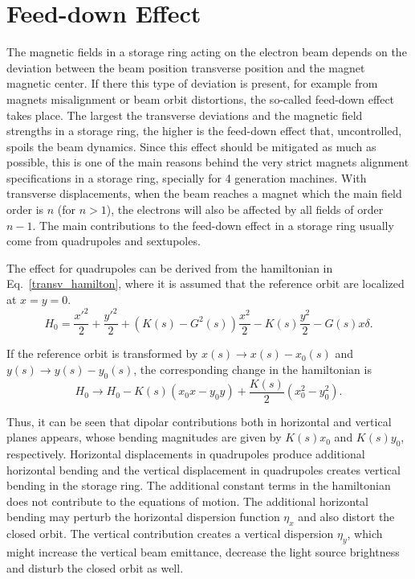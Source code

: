 \chapter{Feed-down Effect}\label{appendix:feed-down}
The magnetic fields in a storage ring acting on the electron beam depends on the deviation between the beam position transverse position and the magnet magnetic center. If there this type of deviation is present, for example from magnets misalignment or beam orbit distortions, the so-called feed-down effect takes place. The largest the transverse deviations and the magnetic field strengths in a storage ring, the higher is the feed-down effect that, uncontrolled, spoils the beam dynamics. Since this effect should be mitigated as much as possible, this is one of the main reasons behind the very strict magnets alignment specifications in a storage ring, specially for 4 generation machines. With transverse displacements, when the beam reaches a magnet which the main field order is $n$ (for $n>1$), the electrons will also be affected by all fields of order $n-1$. The main contributions to the feed-down effect in a storage ring usually come from quadrupoles and sextupoles. 

The effect for quadrupoles can be derived from the hamiltonian in Eq.~\eqref{transv_hamilton}, where it is assumed that the reference orbit are localized at $x=y=0$. 
\begin{equation}
    H_0 = \dfrac{{x'}^2}{2} + \dfrac{{y'}^2}{2} + \left(K(s)- G^{2}(s)\right)\dfrac{{x}^2}{2} - K(s) \frac{y^2}{2} - G(s) x \delta.
\end{equation}

If the reference orbit is transformed by $x(s) \rightarrow x(s) - x_0(s)$ and $y(s) \rightarrow y(s) - y_0(s)$, the corresponding change in the hamiltonian is
\begin{equation}
    H_0 \rightarrow H_0 - K(s)\left(x_0x - y_0y\right) + \dfrac{K(s)}{2}\left(x_0^2 - y_0^2\right).
\end{equation}

Thus, it can be seen that dipolar contributions both in horizontal and vertical planes appears, whose bending magnitudes are given by $K(s)x_0$ and $K(s)y_0$, respectively. Horizontal displacements in quadrupoles produce additional horizontal bending and the vertical displacement in quadrupoles creates vertical bending in the storage ring. The additional constant terms in the hamiltonian does not contribute to the equations of motion. The additional horizontal bending may perturb the horizontal dispersion function $\eta_x$ and also distort the closed orbit. The vertical contribution creates a vertical dispersion $\eta_y$, which might increase the vertical beam emittance, decrease the light source brightness and disturb the closed orbit as well.

